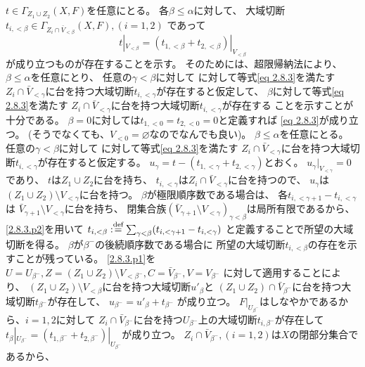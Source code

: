 \documentclass[uplatex,dvipdfmx]{jsarticle}
\makeatletter
\theoremstyle{definition}
\renewenvironment{proof}[1][\proofname]{
  \pushQED{\qed}%
  \normalfont \topsep6\p@\@plus6\p@\relax
  \trivlist
  \item[\hskip\labelsep
    #1\@addpunct{\textbf{.}}]\ignorespaces
}{%
  \popQED\endtrivlist\@endpefalse
}
\providecommand{\proofname}{証明}
\renewcommand{\emptyset}{\varnothing}
\def\dfn{:\overset{\mbox{{\scriptsize def}}}{=}}
\makeatother
\begin{document}
\begin{proof}
  \(t\in \Gamma_{Z_1\cup Z_2}(X,F)\)を任意にとる。
  各\(\beta \leq \alpha\)に対して、
  大域切断
  \(t_{i,<\beta}\in \Gamma_{Z_i\cap \bar{V}_{<\beta}}(X,F),(i=1,2)\)
  であって
  \begin{equation}
    \label{eq 2.8.3}
    t|_{V_{<\beta}}=(t_{1,<\beta}+t_{2,<\beta})|_{V_{<\beta}}
    \tag{\(\bigstar\)}
  \end{equation}
  が成り立つものが存在することを示す。
  そのためには、超限帰納法により、\(\beta \leq \alpha\)を任意にとり、
  任意の\(\gamma<\beta\)に対して
  に対して等式\eqref{eq 2.8.3}を満たす
  \(Z_i\cap \bar{V}_{<\gamma}\)に台を持つ大域切断\(t_{i,<\gamma}\)が存在すると仮定して、
  \(\beta\)に対して等式\eqref{eq 2.8.3}を満たす
  \(Z_i\cap \bar{V}_{<\gamma}\)に台を持つ大域切断\(t_{i,<\gamma}\)が存在する
  ことを示すことが十分である。
  \(\beta = 0\)に対しては\(t_{1,<0} = t_{2,<0} = 0\)と定義すれば
  \eqref{eq 2.8.3}が成り立つ。
  (そうでなくても、\(V_{<0}=\emptyset\)なのでなんでも良い)。
  \(\beta \leq \alpha\)を任意にとる。
  任意の\(\gamma<\beta\)に対して
  に対して等式\eqref{eq 2.8.3}を満たす
  \(Z_i\cap \bar{V}_{<\gamma}\)に台を持つ大域切断\(t_{i,<\gamma}\)が存在すると仮定する。
  \(u_{\gamma} = t-(t_{1,<\gamma}+t_{2,<\gamma})\)とおく。
  \(u_{\gamma}|_{V_{<\gamma}} = 0\)であり、
  \(t\)は\(Z_1\cup Z_2\)に台を持ち、
  \(t_{i,<\gamma}\)は\(Z_i\cap \bar{V}_{<\gamma}\)に台を持つので、
  \(u_{\gamma}\)は\((Z_1\cup Z_2)\setminus V_{<\gamma}\)に台を持つ。
  \(\beta\)が極限順序数である場合は、
  各\(t_{i,<\gamma+1}-t_{i,<\gamma}\)は
  \(\bar{V}_{\gamma+1}\setminus V_{<\gamma}\)に台を持ち、
  閉集合族\((\bar{V}_{\gamma+1}\setminus V_{<\gamma})_{\gamma<\beta}\)は局所有限であるから、
  \ref{2.8.3.p2}を用いて
  \(t_{i,<\beta} \dfn \sum_{\gamma<\beta}(t_{i,<\gamma+1}-t_{i,<\gamma})\)
  と定義することで所望の大域切断を得る。
  \(\beta\)が\(\beta^-\)の後続順序数である場合に
  所望の大域切断\(t_{i,<\beta}\)の存在を示すことが残っている。
  \ref{2.8.3.p1}を
  \(U=U_{\beta^-}, Z=(Z_1\cup Z_2)\setminus V_{<\beta^-},
  C=\bar{V}_{\beta^-}, V=V_{\beta^-}\)
  に対して適用することにより、
  \((Z_1\cup Z_2)\setminus V_{<\beta}\)に台を持つ大域切断\(u'_{\beta}\)と
  \((Z_1\cup Z_2)\cap \bar{V}_{\beta^-}\)に台を持つ大域切断\(t_{\beta^-}\)が存在して、
  \(u_{\beta^-} = u'_{\beta} + t_{\beta^-}\)
  が成り立つ。
  \(F|_{U_{\beta^-}}\)はしなやかであるから、\(i=1,2\)に対して
  \(Z_i\cap \bar{V}_{\beta^-}\)に台を持つ\(U_{\beta^-}\)上の大域切断\(t_{i,\beta^-}\)が存在して
  \(t_{\beta}|_{U_{\beta^-}} = (t_{1,\beta^-}+t_{2,\beta^-})|_{U_{\beta^-}}\)が成り立つ。
  \(Z_i\cap \bar{V}_{\beta^-}, (i=1,2)\)は\(X\)の閉部分集合であるから、

\end{proof}
\end{document}
